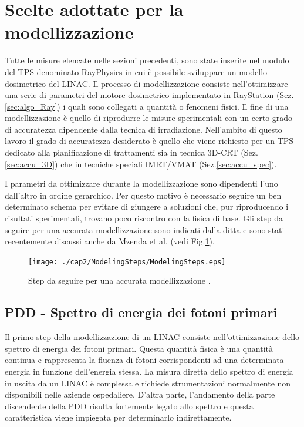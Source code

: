 \section{Scelte adottate per la modellizzazione}
Tutte le misure elencate nelle sezioni precedenti, sono state inserite nel modulo del TPS denominato RayPhysics in cui è possibile sviluppare un modello dosimetrico del LINAC. Il processo di modellizzazione consiste nell'ottimizzare una serie di parametri del motore dosimetrico implementato in RayStation (Sez.\ref{sec:algo_Ray}) i quali sono collegati a quantità o fenomeni fisici. Il fine di una modellizzazione è quello di riprodurre le misure sperimentali con un certo grado di accuratezza dipendente dalla tecnica di irradiazione. Nell'ambito di questo lavoro il grado di accuratezza desiderato è quello che viene richiesto per un TPS dedicato alla pianificazione di trattamenti sia in tecnica 3D-CRT (Sez.\ref{sec:accu_3D}) che in tecniche speciali IMRT/VMAT (Sez.\ref{sec:accu_spec}).

I parametri da ottimizzare durante la modellizzazione sono dipendenti l'uno dall'altro in ordine gerarchico. Per questo motivo è necessario seguire un ben determinato schema per evitare di giungere a soluzioni che, pur riproducendo i risultati sperimentali, trovano poco riscontro con la fisica di base. Gli step da seguire per una accurata modellizzazione sono indicati dalla ditta \cite{RaySearchLaboratories2014} e sono stati recentemente discussi anche da Mzenda et al.\cite{Mzenda2014} (vedi Fig.\ref{fig:modeling_steps}).
\begin{figure}
\centering
\texttt{[image: ./cap2/ModelingSteps/ModelingSteps.eps]}
\caption{Step da seguire per una accurata modellizzazione \cite{Mzenda2014}.}
\label{fig:modeling_steps}
\end{figure}

\subsection{PDD - Spettro di energia dei fotoni primari}
Il primo step della modellizzazione di un LINAC consiste nell'ottimizzazione dello spettro di energia dei fotoni primari. Questa quantità fisica è una quantità continua e rappresenta la fluenza di fotoni corrispondenti ad una determinata energia in funzione dell'energia stessa. La misura diretta dello spettro di energia in uscita da un LINAC è complessa e richiede strumentazioni normalmente non disponibili nelle aziende ospedaliere. D'altra parte, l'andamento della parte discendente della PDD risulta fortemente legato allo spettro \cite{Khan2010} e questa caratteristica viene impiegata per determinarlo indirettamente.

